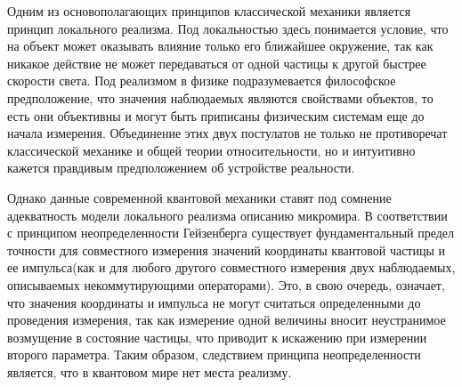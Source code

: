 \documentclass[%
master,         %
subf,           %
href,           %
,times         %
]{disser}
\numberwithin{equation}{section}
\numberwithin{figure}{section}
\begin{document}

%
%
%
%
%
%
%
%
%

\tableofcontents

\intro
Одним из основополагающих принципов классической механики является принцип локального реализма. Под локальностью здесь понимается условие, что на объект может оказывать влияние только его ближайшее окружение, так как никакое действие не может передаваться от одной частицы к другой быстрее скорости света. Под реализмом в физике подразумевается философское предположение, что значения наблюдаемых являются свойствами объектов, то есть они объективны и могут быть приписаны физическим системам еще до начала измерения. Объединение этих двух постулатов не только не противоречат классической механике и общей теории относительности, но и интуитивно кажется правдивым предположением об устройстве реальности.

Однако данные современной квантовой механики ставят под сомнение адекватность модели локального реализма описанию микромира. В соответствии с принципом неопределенности Гейзенберга существует фундаментальный предел точности для совместного измерения значений координаты квантовой частицы и ее импульса(как и для любого другого совместного измерения двух наблюдаемых, описываемых некоммутирующими операторами). Это, в свою очередь, означает, что значения координаты и импульса не могут считаться определенными до проведения измерения, так как измерение одной величины вносит неустранимое возмущение в состояние частицы, что приводит к искажению при измерении второго параметра. Таким образом, следствием принципа неопределенности является, что в квантовом мире нет места реализму.
\end{document}

